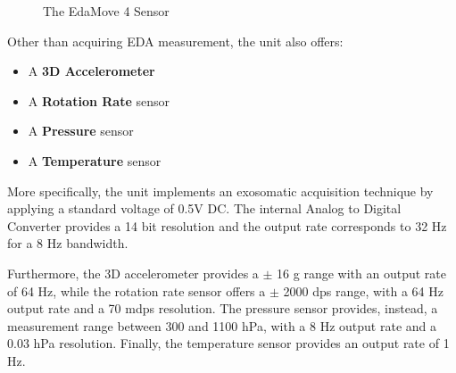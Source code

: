 \begin{figure}[htp]
    \centering
    \hfill%
    \caption{The EdaMove 4 Sensor}
    \label{fig:edamovesensor}
\end{figure}

Other than acquiring EDA measurement, the unit also offers:

\begin{itemize}
    \item A \textbf{3D Accelerometer}
    \item A \textbf{Rotation Rate} sensor
    \item A \textbf{Pressure} sensor
    \item A \textbf{Temperature} sensor
\end{itemize}

More specifically, the unit implements an exosomatic acquisition technique by applying a standard voltage of 0.5V DC. The internal Analog to Digital Converter provides a 14 bit resolution and the output rate corresponds to 32 Hz for a 8 Hz bandwidth.

Furthermore, the 3D accelerometer provides a $\pm$ 16 g range with an output rate of 64 Hz, while the rotation rate sensor offers a $\pm$ 2000 dps range, with a 64 Hz output rate and a 70 mdps resolution. The pressure sensor provides, instead, a measurement range between 300 and 1100 hPa, with a 8 Hz output rate and a 0.03 hPa resolution. Finally, the temperature sensor provides an output rate of 1 Hz.

